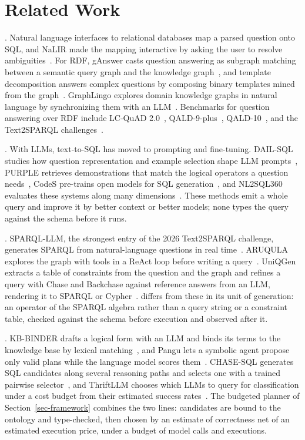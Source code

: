 \section{Related Work}
\label{sec-related}

.
Natural language interfaces to relational databases map a parsed
question onto SQL, and NaLIR made the mapping interactive by asking the
user to resolve ambiguities~\cite{li2014nalir}.
For RDF, gAnswer casts question answering as subgraph matching between
a semantic query graph and the knowledge graph~\cite{zou2014natural},
and template decomposition answers complex questions by composing
binary templates mined from the graph~\cite{zheng2018question}.
GraphLingo explores domain knowledge graphs in natural language by
synchronizing them with an LLM~\cite{le2024graphlingo}.
Benchmarks for question answering over RDF include LC-QuAD
2.0~\cite{dubey2019lcquad}, QALD-9-plus~\cite{qald9plus},
QALD-10~\cite{qald10}, and the Text2SPARQL
challenges~\cite{text2sparql2025,text2sparql}.

.
With LLMs, text-to-SQL has moved to prompting and fine-tuning.
DAIL-SQL studies how question representation and example selection
shape LLM prompts~\cite{gao2024dailsql}, PURPLE retrieves demonstrations
that match the logical operators a question needs~\cite{ren2024purple},
CodeS pre-trains open models for SQL generation~\cite{li2024codes}, and
NL2SQL360 evaluates these systems along many dimensions~\cite{li2024dawn}.
These methods emit a whole query and improve it by better context or
better models; none types the query against the schema before it runs.

.
SPARQL-LLM, the strongest entry of the 2026 Text2SPARQL challenge,
generates SPARQL from natural-language questions in real
time~\cite{smeros2026sparqlllm}.
ARUQULA explores the graph with tools in a ReAct loop before writing a
query~\cite{brei2025aruqula}.
UniQGen extracts a table of constraints from the question and the graph
and refines a query with Chase and Backchase against reference answers
from an LLM, rendering it to SPARQL or Cypher~\cite{wang2026uniqgen}.
\hermes differs from these in its unit of generation: an operator of
the SPARQL algebra rather than a query string or a constraint table,
checked against the schema before execution and observed after it.

.
KB-BINDER drafts a logical form with an LLM and binds its terms to the
knowledge base by lexical matching~\cite{li2023kbbinder}, and Pangu lets
a symbolic agent propose only valid plans while the language model scores
them~\cite{gu2023pangu}.
CHASE-SQL generates SQL candidates along several reasoning paths and
selects one with a trained pairwise selector~\cite{pourreza2025chasesql},
and ThriftLLM chooses which LLMs to query for classification under a cost
budget from their estimated success rates~\cite{huang2025thriftllm}.
The budgeted planner of Section~\ref{sec-framework} combines the two
lines: candidates are bound to the ontology and type-checked, then
chosen by an estimate of correctness net of an estimated execution
price, under a budget of model calls and executions.

